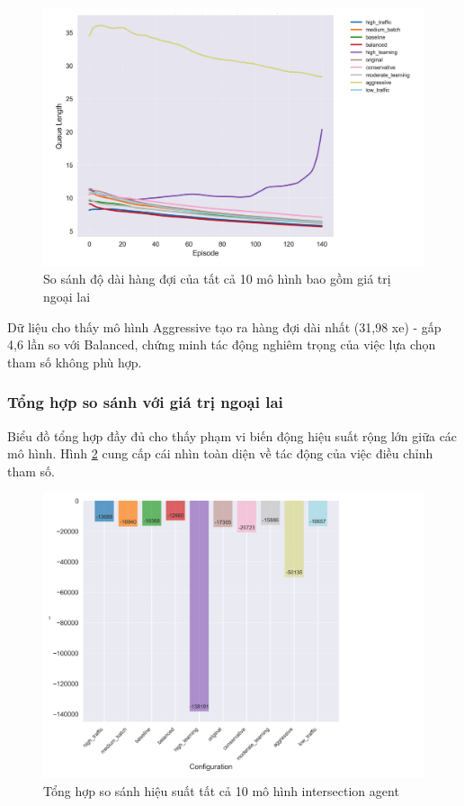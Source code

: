 \begin{figure}[!htp]
    \centering
    \includegraphics[width=\textwidth]{
        figures/individual_plots/intersection_full_queue_length.png
    }
    \caption{So sánh độ dài hàng đợi của tất cả 10 mô hình bao gồm giá trị ngoại lai}
    \label{fig:intersection_full_queue_length}
\end{figure}

Dữ liệu cho thấy mô hình Aggressive tạo ra hàng đợi dài nhất (31,98 xe) - gấp 4,6 lần so với Balanced, chứng minh tác động nghiêm trọng của việc lựa chọn tham số không phù hợp.

\subsubsection{Tổng hợp so sánh với giá trị ngoại lai}
Biểu đồ tổng hợp đầy đủ cho thấy phạm vi biến động hiệu suất rộng lớn giữa các mô hình. Hình \ref{fig:intersection_full_performance_summary} cung cấp cái nhìn toàn diện về tác động của việc điều chỉnh tham số.

\begin{figure}[!htp]
    \centering
    \includegraphics[width=\textwidth]{
        figures/individual_plots/intersection_full_performance_summary.png
    }
    \caption{Tổng hợp so sánh hiệu suất tất cả 10 mô hình intersection agent}
    \label{fig:intersection_full_performance_summary}
\end{figure}

